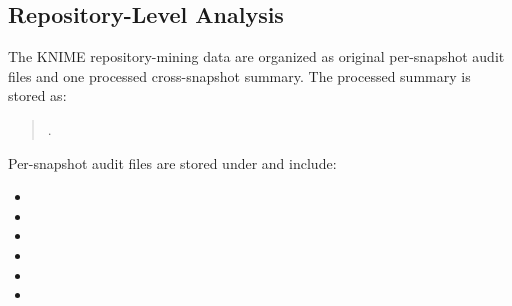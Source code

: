 \documentclass[runningheads]{llncs}
\begin{document}
\subsection{Repository-Level Analysis}

The KNIME repository-mining data are organized as original per-snapshot audit
files and one processed cross-snapshot summary. The processed summary is stored
as:
\begin{quote}

.
\end{quote}
Per-snapshot audit files are stored under
 and include:

\begin{itemize}
\item {}
\item {}
\item {}
\item {}
\item {}
\item {}
\end{itemize}
\end{document}
